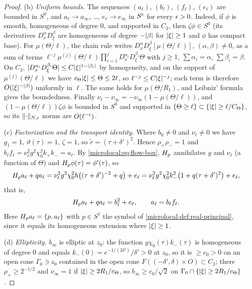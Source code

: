 \begin{proof}
  (b) \emph{Uniform bounds.} The sequences $(a_\ell)$, $(b_\ell)$, $(f_\ell)$, $(e_\ell)$
  are bounded in $S^0$, and $a_\ell\to a_\infty$, \dots, $e_\ell\to e_\infty$ in $S^\epsilon$
  for every $\epsilon>0$. Indeed, if $\phi$ is smooth, homogeneous of degree $0$,
  and supported in $C_3$, then $\zeta\phi\in S^0$ (its derivatives
  $D^\alpha_xD^\beta_\xi$ are homogeneous of degree $-\lvert \beta\rvert$ for $\lvert \xi\rvert\ge1$ and
  $\phi$ has compact base). For $\mu(\Theta/\ell)$, the chain rule writes
  $D^\alpha_xD^\beta_\xi[\mu(\Theta/\ell)]$, $(\alpha,\beta)\ne0$, as a sum of terms
  $\ell^{-j}\mu^{(j)}(\Theta/\ell)\prod_{i=1}^jD^{\alpha_i}_xD^{\beta_i}_\xi\Theta$ with $j\ge1$,
  $\sum\alpha_i=\alpha$, $\sum\beta_i=\beta$. On $C_3$,
  $\lvert D^{\alpha_i}_xD^{\beta_i}_\xi\Theta\rvert\le C\lvert \xi\rvert^{1-\lvert \beta_i\rvert}$ by homogeneity, and on
  the support of $\mu^{(j)}(\Theta/\ell)$ we have $c_\Theta\lvert \xi\rvert\le\Theta\le2\ell$, so
  $\ell^{-j}\le C\lvert \xi\rvert^{-j}$; each term is therefore $O(\lvert \xi\rvert^{-\lvert \beta\rvert})$ uniformly
  in $\ell$. The same holds for $\mu(\Theta/R_1)$, and Leibniz' formula gives
  the boundedness. Finally $\nu_\ell-\nu_\infty=-\nu_\infty(1-\mu(\Theta/\ell))$, and
  $(1-\mu(\Theta/\ell))\zeta\phi$ is bounded in $S^0$ and supported in
  $\{\Theta\ge\ell\}\subset\{\lvert \xi\rvert\ge\ell/C_\Theta\}$, so its $\lVert \cdot\rVert_{N,\epsilon}$ norms are
  $O(\ell^{-\epsilon})$.

  (c) \emph{Factorization and the transport identity.} Where $b_0\ne0$ and
  $\nu_\ell\ne0$ we have $g_1=1$, $\vartheta(\tau)=1$, $\zeta=1$, so
  $\tilde r=(\tau+\delta')^2$. Hence $\rho_+\rho_-=1$ and $b_\ell f_\ell=\nu_\ell^2g^2\chi_0^2k_+k_-=a_\ell$.
  By \eqref{microlocal:eq:flow-box}, $H_{p}$ annihilates $g$ and $\nu_\ell$ (a
  function of $\Theta$) and $H_{p}\phi(\tau)=\phi'(\tau)$, so
  \begin{equation*}
    H_{p}a_\ell+qa_\ell=\nu_\ell^2g^2\chi_0^2h\bigl((\tau+\delta')^{-2}+q\bigr)+e_\ell
    =\nu_\ell^2g^2\chi_0^2k_-^2\bigl(1+q(\tau+\delta')^2\bigr)+e_\ell,
  \end{equation*}
  that is,
  \begin{equation}\label{microlocal:eq:transport-identity}
    H_{p}a_\ell+qa_\ell=b_\ell^2+e_\ell,\qquad a_\ell=b_\ell f_\ell .
  \end{equation}
  Here $H_{p}a_\ell=\{p,a_\ell\}$ with $p\in S^1$ the symbol of
  \cref{microlocal:def:real-principal}, since it equals its homogeneous
  extension where $\lvert \xi\rvert\ge1$.

  (d) \emph{Ellipticity.} $b_\infty$ is elliptic at $z_0$: the function
  $g\chi_0(\tau)k_-(\tau)$ is homogeneous of degree $0$ and equals
  $k_-(0)=e^{-1/(2\delta')}/\delta'>0$ at $z_0$, so it is $\ge c_0>0$ on an open
  cone $\Gamma_0\ni z_0$ contained in the open cone $F((-\delta',\delta)\times O)\subset C_3$; there $\rho_+\ge2^{-1/2}$ and
  $\nu_\infty=1$ if $\lvert \xi\rvert\ge2R_1/c_\Theta$, so $b_\infty\ge c_0/\sqrt2$ on
  $\Gamma_0\cap\{\lvert \xi\rvert\ge2R_1/c_\Theta\}$.


\end{proof}
